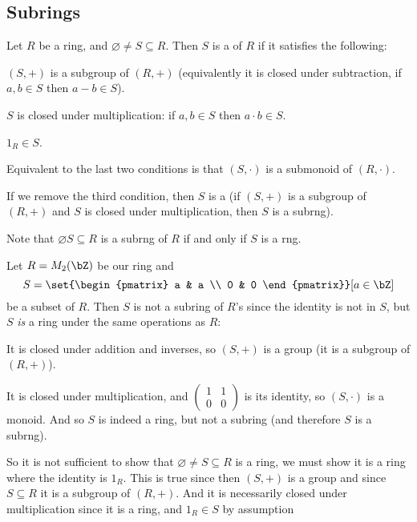 \documentclass[10pt]{article}
\def\pmat#1{\begin{pmatrix} #1 \end{pmatrix}}
\begin{document}


\bigskip

\subsection{Subrings}

\begin{defn*}

    Let $R$ be a ring, and $\varnothing\neq S\subseteq R$.
    Then $S$ is a  of $R$ if it satisfies the following:
    \benum
        \item $(S,+)$ is a subgroup of $(R,+)$ (equivalently it is closed under subtraction, if $a,b\in S$ then $a-b\in S$).
        \item $S$ is closed under multiplication: if $a,b\in S$ then $a\cdot b\in S$.
        \item $1_R\in S$.
    \eenum

    Equivalent to the last two conditions is that $(S,\cdot)$ is a submonoid of $(R,\cdot)$.

    If we remove the third condition, then $S$ is a  (if $(S,+)$ is a subgroup of $(R,+)$ and $S$ is closed under multiplication, then $S$ is a subrng).

\end{defn*}

Note that $\varnothing S\subseteq R$ is a subrng of $R$ if and only if $S$ is a rng.

\begin{exam*}

    Let $R=M_2(\bZ)$ be our ring and
    \[ S = \set{\pmat{a & a \\ 0 & 0}}[a\in\bZ] \]
    be a subset of $R$.
    Then $S$ is not a subring of $R$'s since the identity is not in $S$, but $S$ \emph{is} a ring under the same operations as $R$:
    \benum
        \item It is closed under addition and inverses, so $(S,+)$ is a group (it is a subgroup of $(R,+)$).
        \item It is closed under multiplication, and $\pmat{1 & 1 \\ 0 & 0}$ is its identity, so $(S,\cdot)$ is a monoid.
    \eenum
    And so $S$ is indeed a ring, but not a subring (and therefore $S$ is a subrng).

    So it is not sufficient to show that $\varnothing\neq S\subseteq R$ is a ring, we must show it is a ring where the identity is $1_R$.
    This is true since then $(S,+)$ is a group and since $S\subseteq R$ it is a subgroup of $(R,+)$.
    And it is necessarily closed under multiplication since it is a ring, and $1_R\in S$ by assumption

\end{exam*}
\end{document}
